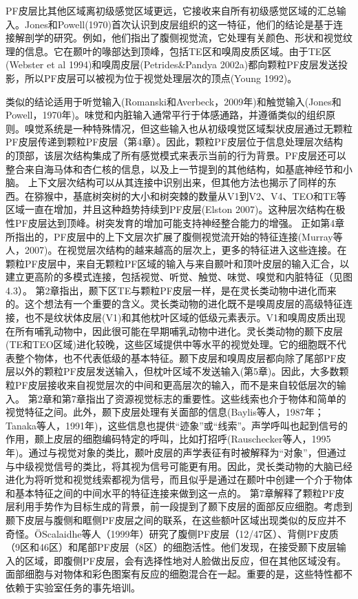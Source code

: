 PF皮层比其他区域离初级感觉区域更远，它接收来自所有初级感觉区域的汇总输入。Jones和Powell(1970)首次认识到皮层组织的这一特征，他们的结论是基于连接解剖学的研究。例如，他们指出了腹侧视觉流，它处理有关颜色、形状和视觉纹理的信息。它在颞叶的喙部达到顶峰，包括TE区和嗅周皮质区域。由于TE区(Webster et al 1994)和嗅周皮层(Petrides\&Pandya 2002a)都向颗粒PF皮层发送投影，所以PF皮层可以被视为位于视觉处理层次的顶点(Young 1992)。

类似的结论适用于听觉输入(Romanski和Averbeck，2009年)和触觉输入(Jones和Powell，1970年)。味觉和内脏输入通常平行于体感通路，并遵循类似的组织原则。嗅觉系统是一种特殊情况，但这些输入也从初级嗅觉区域梨状皮层通过无颗粒PF皮层传递到颗粒PF皮层（第4章）。因此，颗粒PF皮层位于信息处理层次结构的顶部，该层次结构集成了所有感觉模式来表示当前的行为背景。PF皮层还可以整合来自海马体和杏仁核的信息，以及上一节提到的其他结构，如基底神经节和小脑。
上下文层次结构可以从其连接中识别出来，但其他方法也揭示了同样的东西。在猕猴中，基底树突树的大小和树突棘的数量从V1到V2、V4、TEO和TE等区域一直在增加，并且这种趋势持续到PF皮层(Elston 2007)。这种层次结构在极性PF皮层达到顶峰。树突发育的增加可能支持神经整合能力的增强。
正如第4章所指出的，PF皮层中的上下文层次扩展了腹侧视觉流开始的特征连接(Murray等人，2007)。在视觉层次结构的越来越高的层次上，更多的特征进入这些连接。在颗粒PF皮层中，来自无颗粒PF区域的输入与来自颞叶和顶叶皮层的输入汇合，以建立更高阶的多模式连接，包括视觉、听觉、触觉、味觉、嗅觉和内脏特征（见图4.3）。
第2章指出，颞下区TE与颗粒PF皮层一样，是在灵长类动物中进化而来的。这个想法有一个重要的含义。灵长类动物的进化既不是嗅周皮层的高级特征连接，也不是纹状体皮层(V1)和其他枕叶区域的低级元素表示。V1和嗅周皮质出现在所有哺乳动物中，因此很可能在早期哺乳动物中进化。灵长类动物的颞下皮层(TE和TEO区域)进化较晚，这些区域提供中等水平的视觉处理。它的细胞既不代表整个物体，也不代表低级的基本特征。颞下皮层和嗅周皮层都向除了尾部PF皮层以外的颗粒PF皮层发送输入，但枕叶区域不发送输入(第5章)。因此，大多数颗粒PF皮层接收来自视觉层次的中间和更高层次的输入，而不是来自较低层次的输入。
第2章和第7章指出了资源视觉标志的重要性。这些线索也介于物体和简单的视觉特征之间。此外，颞下皮层处理有关面部的信息(Baylis等人，1987年；Tanaka等人，1991年)，这些信息也提供“迹象”或“线索”。声学呼叫也起到信号的作用，颞上皮层的细胞编码特定的呼叫，比如打招呼(Rauschecker等人，1995年)。通过与视觉对象的类比，颞叶皮层的声学表征有时被解释为“对象”，但通过与中级视觉信号的类比，将其视为信号可能更有用。因此，灵长类动物的大脑已经进化为将听觉和视觉线索都视为信号，而且似乎是通过在颞叶中创建一个介于物体和基本特征之间的中间水平的特征连接来做到这一点的。
第7章解释了颗粒PF皮层利用手势作为目标生成的背景，前一段提到了颞下皮层的面部反应细胞。考虑到颞下皮层与腹侧和眶侧PF皮层之间的联系，在这些额叶区域出现类似的反应并不奇怪。ÖScalaidhe等人（1999年）研究了腹侧PF皮层（12/47区）、背侧PF皮质（9区和46区）和尾部PF皮层（8区）的细胞活性。他们发现，在接受颞下皮层输入的区域，即腹侧PF皮层，会有选择性地对人脸做出反应，但在其他区域没有。面部细胞与对物体和彩色图案有反应的细胞混合在一起。重要的是，这些特性都不依赖于实验室任务的事先培训。
